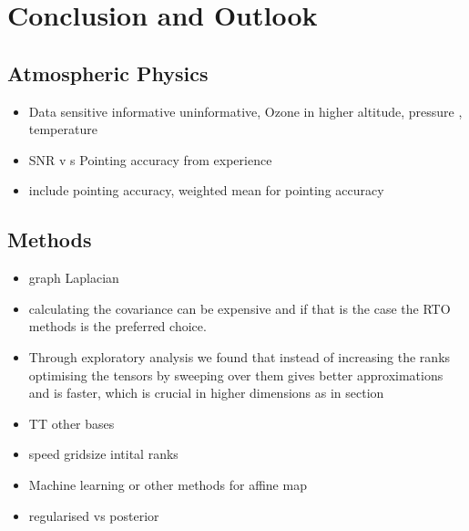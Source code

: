 \chapter{Conclusion and Outlook}
\label{ch:Concl}

\section{Atmospheric Physics}
\begin{itemize}
	\item Data sensitive informative uninformative, Ozone in higher altitude, pressure , temperature
	\item SNR v s Pointing accuracy from experience
	\item include pointing accuracy, weighted mean for pointing accuracy
\end{itemize}

\section{Methods}
\begin{itemize}
	\item graph Laplacian
	\item calculating the covariance can be expensive and if that is the case the RTO methods is the preferred choice.
	\item Through exploratory analysis we found that instead of increasing the ranks optimising the tensors by sweeping over them gives better approximations and is faster, which is crucial in higher dimensions as in section
	\item TT other bases
	\item speed gridsize intital ranks
	\item Machine learning or other methods for affine map
	\item regularised vs posterior
\end{itemize}